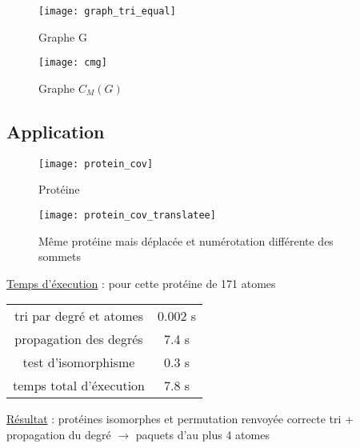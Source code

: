 
\begin{multicols}{2}
    \begin{figure}[!htb]
        \centering
        \texttt{[image: graph\_tri\_equal]}
        \caption{\label{fig: Graphe G}Graphe G}
    \end{figure}
    \begin{figure}[!htb]
        \centering
        \texttt{[image: cmg]}
        \caption{\label{fig: Isomorphe G} Graphe $C_M(G)$}
    \end{figure}
\end{multicols}
    
\subsection{Application}

\begin{multicols}{2}
    \begin{figure}[!htb]
        \centering
        \texttt{[image: protein\_cov]}
        \caption{\label{fig: Protéine}Protéine}
    \end{figure}
    \begin{center}
    \begin{figure}[!htb]
        \centering
        \texttt{[image: protein\_cov\_translatee]}
        \caption{\label{fig: Protéine translatée}Même protéine mais déplacée et numérotation différente des sommets}
    \end{figure}
    \end{center}
\end{multicols}
\underline{Temps d'éxecution} : pour cette protéine de 171 atomes
\begin{center}
\begin{tabular}{c|c}
    tri par degré et atomes & 0.002 s\\
    propagation des degrés & 7.4 s \\
    test d'isomorphisme & 0.3 s \\
    temps total d'éxecution & 7.8 s
\end{tabular}
\end{center}
\underline{Résultat} : protéines isomorphes et permutation renvoyée correcte
\newline tri + propagation du degré $\rightarrow$ paquets d'au plus 4 atomes
